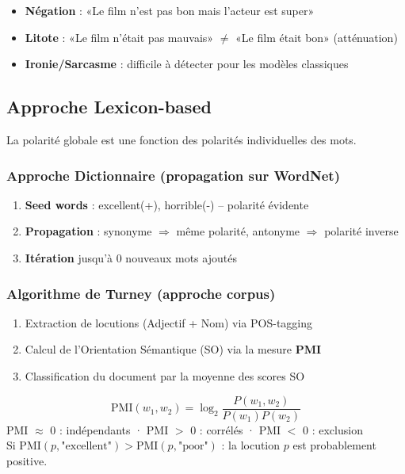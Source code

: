 \documentclass[a4paper,10pt]{article}
\begin{document}
\begin{warningbox}
\begin{itemize}
  \item \textbf{Négation} : «Le film n'est pas bon mais l'acteur est super»
  \item \textbf{Litote} : «Le film n'était pas mauvais» $\neq$ «Le film était bon» (atténuation)
  \item \textbf{Ironie/Sarcasme} : difficile à détecter pour les modèles classiques
\end{itemize}
\end{warningbox}

\subsection{Approche Lexicon-based}

\begin{definitionbox}[Hypothèse]
La polarité globale est une fonction des polarités individuelles des mots.
\end{definitionbox}

\subsubsection{Approche Dictionnaire (propagation sur WordNet)}
\begin{enumerate}
  \item \textbf{Seed words} : excellent(+), horrible(-) -- polarité évidente
  \item \textbf{Propagation} : synonyme $\Rightarrow$ même polarité, antonyme $\Rightarrow$ polarité inverse
  \item \textbf{Itération} jusqu'à 0 nouveaux mots ajoutés
\end{enumerate}

\subsubsection{Algorithme de Turney (approche corpus)}
\begin{enumerate}
  \item Extraction de locutions (Adjectif + Nom) via POS-tagging
  \item Calcul de l'Orientation Sémantique (SO) via la mesure \textbf{PMI}
  \item Classification du document par la moyenne des scores SO
\end{enumerate}

\begin{formulebox}
\[
\text{PMI}(w_1, w_2) = \log_2 \frac{P(w_1, w_2)}{P(w_1)P(w_2)}
\]
PMI $\approx$ 0 : indépendants · PMI $>$ 0 : corrélés · PMI $<$ 0 : exclusion\\
Si $\text{PMI}(p, \text{"excellent"}) > \text{PMI}(p, \text{"poor"})$ : la locution $p$ est probablement positive.
\end{formulebox}
\end{document}
